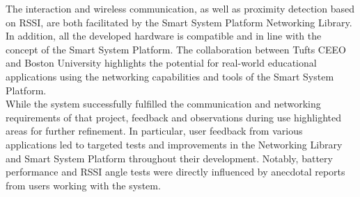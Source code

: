 The interaction and wireless communication, as well as proximity detection based on RSSI, are both facilitated by the Smart System Platform Networking Library. In addition, all the developed hardware is compatible and in line with the concept of the Smart System Platform. The collaboration between Tufts CEEO and Boston University highlights the potential for real-world educational applications using the networking capabilities and tools of the Smart System Platform.\\

While the system successfully fulfilled the communication and networking requirements of that project, feedback and observations during use highlighted areas for further refinement. In particular, user feedback from various applications led to targeted tests and improvements in the Networking Library and Smart System Platform throughout their development. Notably, battery performance and RSSI angle tests were directly influenced by anecdotal reports from users working with the system.





